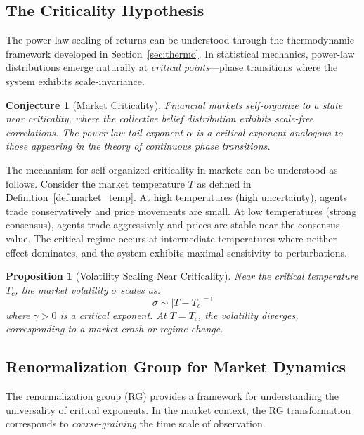 \documentclass[12pt,a4paper]{article}
\newtheorem{proposition}[theorem]{Proposition}
\newtheorem{conjecture}[theorem]{Conjecture}
\theoremstyle{definition}
\begin{document}
\subsection{The Criticality Hypothesis}

The power-law scaling of returns can be understood through the thermodynamic framework developed in Section~\ref{sec:thermo}. In statistical mechanics, power-law distributions emerge naturally at \emph{critical points}---phase transitions where the system exhibits scale-invariance.

\begin{conjecture}[Market Criticality]\label{conj:criticality}
Financial markets self-organize to a state near criticality, where the collective belief distribution exhibits scale-free correlations. The power-law tail exponent $\alpha$ is a \emph{critical exponent} analogous to those appearing in the theory of continuous phase transitions.
\end{conjecture}

The mechanism for self-organized criticality in markets can be understood as follows. Consider the market temperature $T$ as defined in Definition~\ref{def:market_temp}. At high temperatures (high uncertainty), agents trade conservatively and price movements are small. At low temperatures (strong consensus), agents trade aggressively and prices are stable near the consensus value. The critical regime occurs at intermediate temperatures where neither effect dominates, and the system exhibits maximal sensitivity to perturbations.

\begin{proposition}[Volatility Scaling Near Criticality]\label{prop:vol_scaling}
Near the critical temperature $T_c$, the market volatility $\sigma$ scales as:
\begin{equation}\label{eq:vol_scaling}
    \sigma \sim |T - T_c|^{-\gamma}
\end{equation}
where $\gamma > 0$ is a critical exponent. At $T = T_c$, the volatility diverges, corresponding to a market crash or regime change.
\end{proposition}

\subsection{Renormalization Group for Market Dynamics}

The renormalization group (RG) provides a framework for understanding the universality of critical exponents. In the market context, the RG transformation corresponds to \emph{coarse-graining} the time scale of observation.
\end{document}
